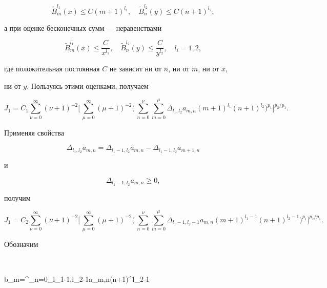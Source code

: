 $$ 


\widetilde B_m^{l_1}(x)\le C(m+1)^{l_1},\quad 


\widetilde B_n^{l_2}(y)\le C(n+1)^{l_2}, 


$$ 


а при оценке бесконечных сумм --- неравенствами 


$$ 


\widetilde B_m^{l_1}(x)\le \frac{C}{x^{l_1}},\quad 


\widetilde B_n^{l_2}(y)\le \frac{C}{y^{l_2}},\quad l_i=1,2, 


$$ 


где положительная постоянная $C$ не зависит ни от $n$, ни от $m$, ни от $x$, 


ни от $y$. Пользуясь этими оценками, получаем 


$$ 


J_1=C_1\sum^\infty_{\nu=0}(\nu+1)^{-2}\biggl[\,


\sum^\infty_{\mu=0}(\mu+1)^{-2}\biggl(\, 


\sum^\nu_{n=0}\sum^\mu_{m=0}\Delta_{l_1,l_2}a_{m,n} 


(m+1)^{l_1}(n+1)^{l_2}\biggr)^{p_1} 


\biggr]^{p_2/p_1}.


$$ 


Применяя свойства 


$$ 


\Delta_{l_1,l_2}a_{m,n}=\Delta_{l_1-1,l_2}a_{m,n}- 


\Delta_{l_1-1,l_2}a_{m+1,n} 


$$ 


и 


$$ 


\Delta_{l_1-1,l_2}a_{m,n}\ge 0, 


$$ 


получим 


$$ 


J_1=C_2\sum^\infty_{\nu=0}(\nu+1)^{-2}\biggl[\,


\sum^\infty_{\mu=0}(\mu+1)^{-2}\biggl(\, 


\sum^\nu_{n=0}\sum^\mu_{m=0}\Delta_{l_1-1,l_2-1}a_{m,n} 


(m+1)^{l_1-1}(n+1)^{l_2-1}\biggr)^{p_1} 


\biggr]^{p_2/p_1}.


$$ 


Обозначим 


$$ 


b_m=\sum^\nu_{n=0}\Delta_{l_1-1,l_2-1}a_{m,n}(n+1)^{l_2-1} 


